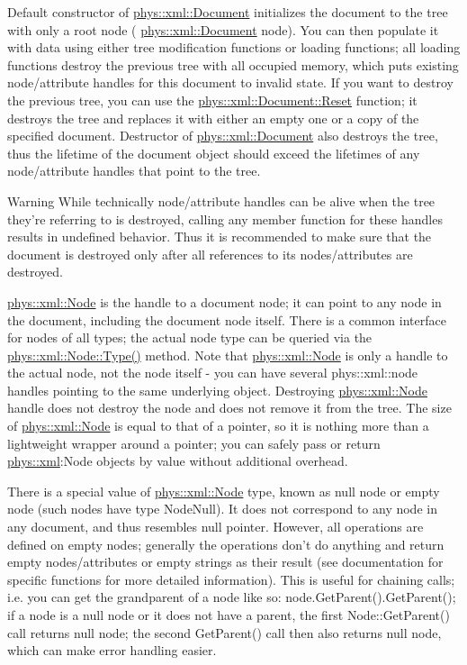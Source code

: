  \par
 Default constructor of \hyperlink{classphys_1_1xml_1_1Document}{phys::xml::Document} initializes the document to the tree with only a root node ( \hyperlink{classphys_1_1xml_1_1Document}{phys::xml::Document} node). You can then populate it with data using either tree modification functions or loading functions; all loading functions destroy the previous tree with all occupied memory, which puts existing node/attribute handles for this document to invalid state. If you want to destroy the previous tree, you can use the \hyperlink{classphys_1_1xml_1_1Document_a9ab556271e4a1214ecb35ba6aef9e8e4}{phys::xml::Document::Reset} function; it destroys the tree and replaces it with either an empty one or a copy of the specified document. Destructor of \hyperlink{classphys_1_1xml_1_1Document}{phys::xml::Document} also destroys the tree, thus the lifetime of the document object should exceed the lifetimes of any node/attribute handles that point to the tree. \begin{DoxyWarning}{Warning}
While technically node/attribute handles can be alive when the tree they're referring to is destroyed, calling any member function for these handles results in undefined behavior. Thus it is recommended to make sure that the document is destroyed only after all references to its nodes/attributes are destroyed.
\end{DoxyWarning}
\hyperlink{classphys_1_1xml_1_1Node}{phys::xml::Node} is the handle to a document node; it can point to any node in the document, including the document node itself. There is a common interface for nodes of all types; the actual node type can be queried via the \hyperlink{classphys_1_1xml_1_1Node_a33288f89218baf24d1061c6eeb08687f}{phys::xml::Node::Type()} method. Note that \hyperlink{classphys_1_1xml_1_1Node}{phys::xml::Node} is only a handle to the actual node, not the node itself -\/ you can have several phys::xml::node handles pointing to the same underlying object. Destroying \hyperlink{classphys_1_1xml_1_1Node}{phys::xml::Node} handle does not destroy the node and does not remove it from the tree. The size of \hyperlink{classphys_1_1xml_1_1Node}{phys::xml::Node} is equal to that of a pointer, so it is nothing more than a lightweight wrapper around a pointer; you can safely pass or return \hyperlink{namespacephys_1_1xml}{phys::xml}:Node objects by value without additional overhead. \par
 \par
 There is a special value of \hyperlink{classphys_1_1xml_1_1Node}{phys::xml::Node} type, known as null node or empty node (such nodes have type NodeNull). It does not correspond to any node in any document, and thus resembles null pointer. However, all operations are defined on empty nodes; generally the operations don't do anything and return empty nodes/attributes or empty strings as their result (see documentation for specific functions for more detailed information). This is useful for chaining calls; i.e. you can get the grandparent of a node like so: node.GetParent().GetParent(); if a node is a null node or it does not have a parent, the first Node::GetParent() call returns null node; the second GetParent() call then also returns null node, which can make error handling easier. \par
